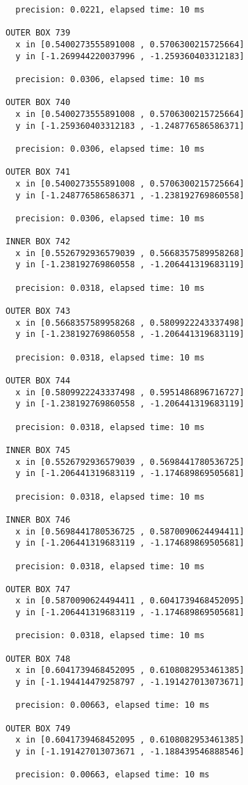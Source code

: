 \begin{verbatim}
  precision: 0.0221, elapsed time: 10 ms

OUTER BOX 739
  x in [0.5400273555891008 , 0.5706300215725664]
  y in [-1.269944220037996 , -1.259360403312183]

  precision: 0.0306, elapsed time: 10 ms

OUTER BOX 740
  x in [0.5400273555891008 , 0.5706300215725664]
  y in [-1.259360403312183 , -1.248776586586371]

  precision: 0.0306, elapsed time: 10 ms

OUTER BOX 741
  x in [0.5400273555891008 , 0.5706300215725664]
  y in [-1.248776586586371 , -1.238192769860558]

  precision: 0.0306, elapsed time: 10 ms

INNER BOX 742
  x in [0.5526792936579039 , 0.5668357589958268]
  y in [-1.238192769860558 , -1.206441319683119]

  precision: 0.0318, elapsed time: 10 ms

OUTER BOX 743
  x in [0.5668357589958268 , 0.5809922243337498]
  y in [-1.238192769860558 , -1.206441319683119]

  precision: 0.0318, elapsed time: 10 ms

OUTER BOX 744
  x in [0.5809922243337498 , 0.5951486896716727]
  y in [-1.238192769860558 , -1.206441319683119]

  precision: 0.0318, elapsed time: 10 ms

INNER BOX 745
  x in [0.5526792936579039 , 0.5698441780536725]
  y in [-1.206441319683119 , -1.174689869505681]

  precision: 0.0318, elapsed time: 10 ms

INNER BOX 746
  x in [0.5698441780536725 , 0.5870090624494411]
  y in [-1.206441319683119 , -1.174689869505681]

  precision: 0.0318, elapsed time: 10 ms

OUTER BOX 747
  x in [0.5870090624494411 , 0.6041739468452095]
  y in [-1.206441319683119 , -1.174689869505681]

  precision: 0.0318, elapsed time: 10 ms

OUTER BOX 748
  x in [0.6041739468452095 , 0.6108082953461385]
  y in [-1.194414479258797 , -1.191427013073671]

  precision: 0.00663, elapsed time: 10 ms

OUTER BOX 749
  x in [0.6041739468452095 , 0.6108082953461385]
  y in [-1.191427013073671 , -1.188439546888546]

  precision: 0.00663, elapsed time: 10 ms


\end{verbatim}
